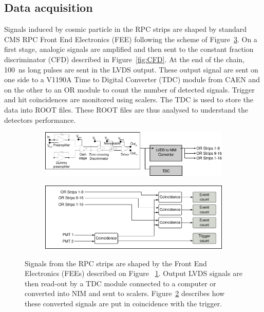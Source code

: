 	\subsection{Data acquisition}
	\label{ssec:GIFDAQ}
	
		Signals induced by cosmic particle in the RPC strips are shaped by standard CMS RPC Front End Electronics (FEE) following the scheme of Figure~\ref{fig:DAQ}. On a first stage, analogic signals are amplified and then sent to the constant fraction discriminator (CFD) described in Figure~\ref{fig:CFD}. At the end of the chain, \SI{100}{ns} long pulses are sent in the LVDS output. These output signal are sent on one side to a V1190A Time to Digital Converter (TDC) module from CAEN and on the other to an OR module to count the number of detected signals. Trigger and hit coïncidences are monitored using scalers. The TDC is used to store the data into ROOT files. These ROOT files are thus analysed to understand the detectors performance.

			\begin{figure}[!h]
			\begin{subfigure}{\linewidth}
				\begin{center}
					\includegraphics[width = \plotwidth]{fig/pulse-processing.pdf}\\
					\caption{\label{fig:DAQ:A}}
				\end{center}
			\end{subfigure}
			\begin{subfigure}{\linewidth}
				\begin{center}
					\includegraphics[width = \plotwidth]{fig/pulse-processing-2.pdf}
					\caption{\label{fig:DAQ:B}}
				\end{center}
			\end{subfigure}
			\caption{\label{fig:DAQ} Signals from the RPC strips are shaped by the Front End Electronics (FEEs) described on Figure ~\ref{fig:DAQ:A}. Output LVDS signals are then read-out by a TDC module connected to a computer or converted into NIM and sent to scalers. Figure~\ref{fig:DAQ:B} describes how these converted signals are put in coincidence with the trigger.}
		\end{figure}
		
